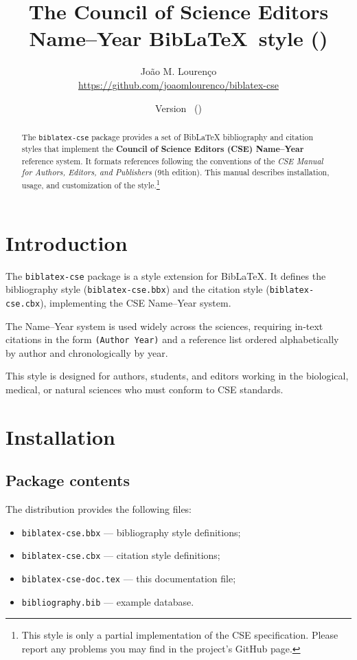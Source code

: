 \documentclass[11pt]{article}
\title{The Council of Science Editors Name--Year Bib\LaTeX\ style (\textsf{\filename})}
\author{João M. Lourenço\\\url{https://github.com/joaomlourenco/biblatex-cse}}
\date{Version \bltxcsefileversion\ (\bltxcsefiledate)}
\begin{document}
\maketitle

\begin{abstract}
The \texttt{biblatex-cse} package provides a set of Bib\LaTeX{} bibliography and citation styles that implement the \textbf{Council of Science Editors (CSE) Name--Year} reference system. It formats references following the conventions of the \emph{CSE Manual for Authors, Editors, and Publishers} (9th edition). This manual describes installation, usage, and customization of the style.\footnote{This style is only a partial implementation of the CSE specification.  Please report any problems you may find in the project's GitHub page.}
\end{abstract}

\tableofcontents

\section{Introduction}

The \texttt{biblatex-cse} package is a style extension for Bib\LaTeX{}.  
It defines the bibliography style (\texttt{biblatex-cse.bbx}) and the citation style (\texttt{biblatex-cse.cbx}), implementing the CSE Name--Year system.

The Name--Year system is used widely across the sciences, requiring in-text citations in the form \texttt{(Author Year)} and a reference list ordered alphabetically by author and chronologically by year.

This style is designed for authors, students, and editors working in the biological, medical, or natural sciences who must conform to CSE standards.

\section{Installation}

\subsection{Package contents}
The distribution provides the following files:
\begin{itemize}
  \item \texttt{biblatex-cse.bbx} --- bibliography style definitions;
  \item \texttt{biblatex-cse.cbx} --- citation style definitions;
  \item \texttt{biblatex-cse-doc.tex} --- this documentation file;
  \item \texttt{bibliography.bib} --- example database.
\end{itemize}
\end{document}
